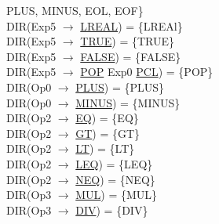 \documentclass[\main/MemoriaPL.tex]{subfiles}
\begin{document}
    \hspace{42mm}PLUS, MINUS, EOL, EOF\}\\
    DIR(Exp5 $\rightarrow$ \underline{LREAL}) = \{LREAl\}\\
    DIR(Exp5 $\rightarrow$ \underline{TRUE}) = \{TRUE\}\\
    DIR(Exp5 $\rightarrow$ \underline{FALSE}) = \{FALSE\}\\
    DIR(Exp5 $\rightarrow$ \underline{POP} Exp0 \underline{PCL}) = \{POP\}\\
    DIR(Op0 $\rightarrow$ \underline{PLUS}) = \{PLUS\}\\
    DIR(Op0 $\rightarrow$ \underline{MINUS}) = \{MINUS\}\\
    DIR(Op2 $\rightarrow$ \underline{EQ}) = \{EQ\}\\
    DIR(Op2 $\rightarrow$ \underline{GT}) = \{GT\}\\
    DIR(Op2 $\rightarrow$ \underline{LT}) = \{LT\}\\
    DIR(Op2 $\rightarrow$ \underline{LEQ}) = \{LEQ\}\\
    DIR(Op2 $\rightarrow$ \underline{NEQ}) = \{NEQ\}\\
    DIR(Op3 $\rightarrow$ \underline{MUL}) = \{MUL\}\\
    DIR(Op3 $\rightarrow$ \underline{DIV}) = \{DIV\}\\
\end{document}
